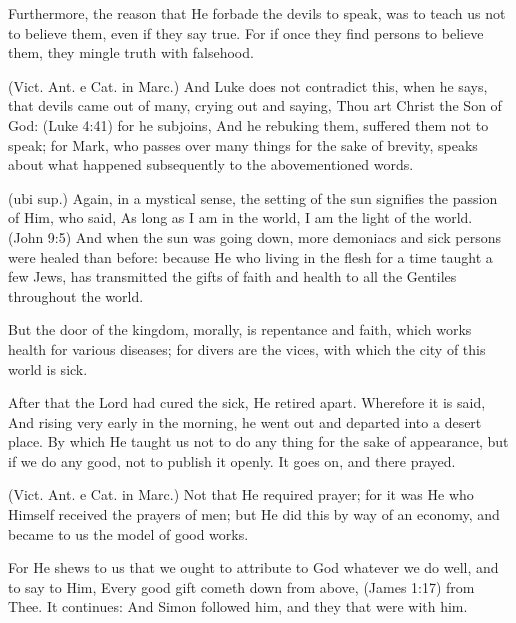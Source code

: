  Furthermore, the reason that He forbade the devils to speak, was to teach us not to believe them, even if they say true. For if once they find persons to believe them, they mingle truth with falsehood.

 (Vict. Ant. e Cat. in Marc.) And Luke does not contradict this, when he says, that devils came out of many, crying out and saying, Thou art Christ the Son of God: (Luke 4:41) for he subjoins, And he rebuking them, suffered them not to speak; for Mark, who passes over many things for the sake of brevity, speaks about what happened subsequently to the abovementioned words.

 (ubi sup.) Again, in a mystical sense, the setting of the sun signifies the passion of Him, who said, As long as I am in the world, I am the light of the world. (John 9:5) And when the sun was going down, more demoniacs and sick persons were healed than before: because He who living in the flesh for a time taught a few Jews, has transmitted the gifts of faith and health to all the Gentiles throughout the world.

 But the door of the kingdom, morally, is repentance and faith, which works health for various diseases; for divers are the vices, with which the city of this world is sick.

 

 After that the Lord had cured the sick, He retired apart. Wherefore it is said, And rising very early in the morning, he went out and departed into a desert place. By which He taught us not to do any thing for the sake of appearance, but if we do any good, not to publish it openly. It goes on, and there prayed.

 (Vict. Ant. e Cat. in Marc.) Not that He required prayer; for it was He who Himself received the prayers of men; but He did this by way of an economy, and became to us the model of good works.

 For He shews to us that we ought to attribute to God whatever we do well, and to say to Him, Every good gift cometh down from above, (James 1:17) from Thee. It continues: And Simon followed him, and they that were with him.

